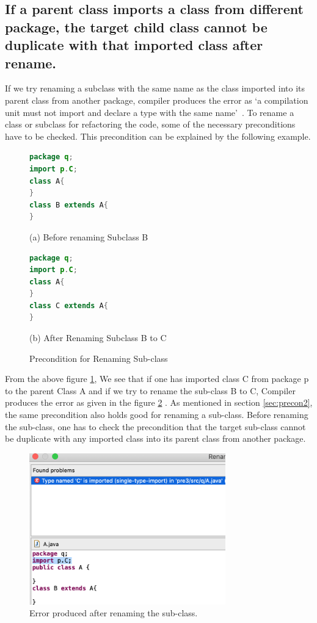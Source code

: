 \subsection{If a parent class imports a class from different package, the target child class cannot be duplicate with that imported class after rename.}

If we try renaming a subclass with the same name as the class imported into its parent class from another package, compiler produces the error as `a compilation unit must not import and declare a type with the same name'~\cite{EclipseWebPage}. 
To rename a class or subclass for refactoring the code, some of the necessary preconditions have to be checked. This precondition can be explained by the following example.

\begin{figure}[th]
\centering
\begin{minipage}[t]{0.45\linewidth}
\begin{lstlisting}[language=java, basicstyle=\scriptsize\ttfamily,frame=single]	
package q;
import p.C;
class A{	
}
class B extends A{	
}	
\end{lstlisting}
\tiny{(a) Before renaming Subclass B}
\end{minipage}
\hfill
\begin{minipage}[t]{0.45\linewidth}
\begin{lstlisting}[language=java, basicstyle=\scriptsize\ttfamily,frame=single]
package q;
import p.C;
class A{	
}
class C extends A{	
}	
\end{lstlisting}
\tiny{(b) After Renaming Subclass B to C}
\end{minipage}
\caption{Precondition for Renaming Sub-class}
\label{figure:fig7}
\end{figure}

From the above figure \ref{figure:fig7}, We see that if one has imported class C from  package  p to the parent Class A and if we try to rename the sub-class B to C, Compiler produces  the error as given in the figure \ref{figure:fig8} . As mentioned in  section \ref{sec:precon2}, the same precondition also holds good for renaming a sub-class. Before renaming the sub-class, one has to check the precondition that the  target sub-class cannot be duplicate with any imported class into its parent class from another package.

\begin{figure}[htbp]
\centerline{\includegraphics[width=85mm,scale=0.5]{precond3.png}}
\caption{Error produced after renaming the sub-class.}
\label{figure:fig8}
\end{figure}
